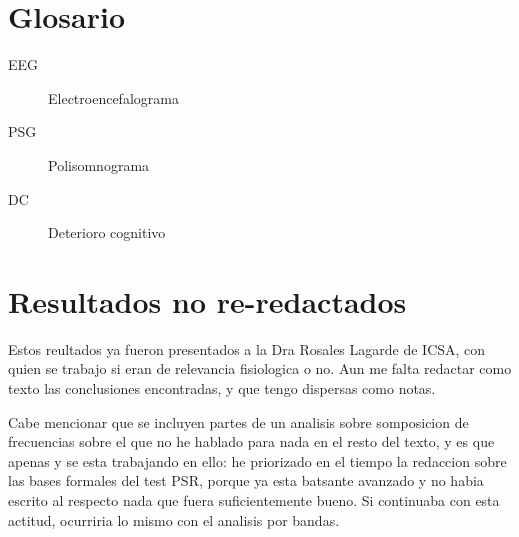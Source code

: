 \documentclass[12pt,a4paper]{mitthesis}
\begin{document}




\tableofcontents
\newpage


\chapter*{Glosario}

\begin{description}
\item[EEG] Electroencefalograma
\item[PSG] Polisomnograma
\item[DC] Deterioro cognitivo
\end{description}


















\appendix

\chapter{Resultados no re-redactados}

Estos reultados ya fueron presentados a la Dra Rosales Lagarde de ICSA, con quien se
trabajo si eran de relevancia fisiologica o no. Aun me falta redactar como texto las conclusiones
encontradas, y que tengo dispersas como notas. 

Cabe mencionar que se incluyen partes de un analisis
sobre somposicion de frecuencias sobre el que no he hablado para nada en el resto del texto,
y es que apenas y se esta trabajando en ello: he priorizado en el tiempo la redaccion
sobre  las bases
formales del test PSR, porque ya esta batsante avanzado y no habia escrito al respecto nada que fuera
suficientemente bueno. Si continuaba con esta actitud, ocurriria lo mismo con el analisis por bandas.
\end{document}

